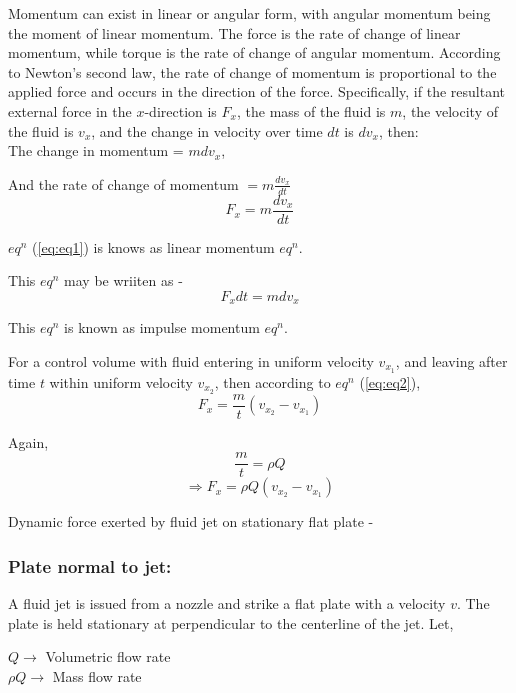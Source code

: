 \documentclass{article}
\begin{document}
Momentum can exist in linear or angular form, with angular momentum being the moment of linear momentum. The force is the rate of change of linear momentum, while torque is the rate of change of angular momentum. According to Newton's second law, the rate of change of momentum is proportional to the applied force and occurs in the direction of the force. Specifically, if the resultant external force in the $x$-direction is $F_x$, the mass of the fluid is $m$, the velocity of the fluid is $v_x$, and the change in velocity over time $dt$ is $dv_x$, then:
\\

The change in momentum = $mdv_x$,

And the rate of change of momentum  $= m \frac{dv_x}{dt}$
\begin{equation}
F_x = m \frac{dv_x}{dt} \label{eq:eq1}
\end{equation}

$eq^n$ (\ref{eq:eq1}) is knows as linear momentum $eq^n$.

This $eq^n$ may be wriiten as -
\begin{equation}
F_x dt = mdv_x \label{eq:eq2}
\end{equation}

This $eq^n$ is known as impulse momentum $eq^n$.

For a control volume with fluid entering in uniform velocity $v_{x_{1}}$, and leaving after time $t$ within uniform velocity $v_{x_{2}}$, then according to $eq^n$ (\ref{eq:eq2}),
\begin{equation}
	F_x = \frac{m}{t} (v_{x_{2}}-v_{x_{1}}) \label{eq:eq3}
\end{equation}

Again, $$\frac{m}{t}=\rho Q$$
\begin{equation}
	\Rightarrow F_x = \rho Q (v_{x_{2}}-v_{x_{1}}) \label{eq:eq4}
\end{equation}

Dynamic force exerted by fluid jet on stationary flat plate - 

\subsubsection{Plate normal to jet:}
A fluid jet is issued from a nozzle and strike a flat plate with a velocity $v$. The plate is held stationary at perpendicular to the centerline of the jet. Let,

\begin{center}

$Q \longrightarrow $  Volumetric flow rate\\
$\rho Q \longrightarrow$ Mass flow rate
\end{center}
\end{document}
